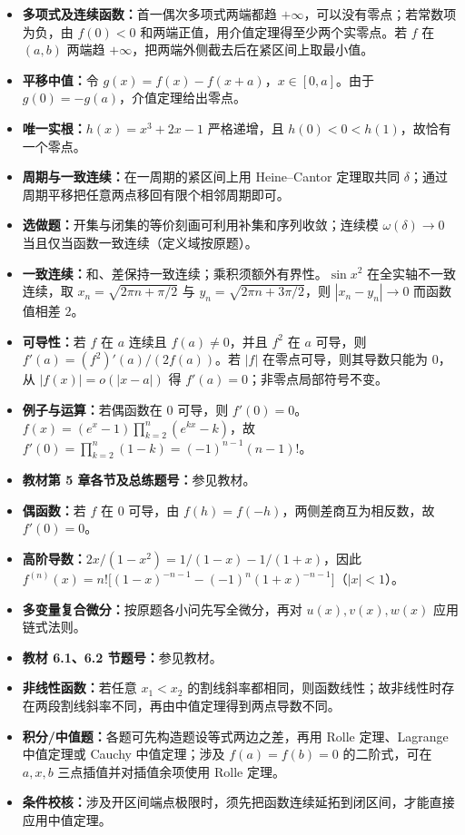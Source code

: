 \begin{itemize}
\item \textbf{多项式及连续函数：}首一偶次多项式两端都趋 $+\infty$，可以没有零点；若常数项为负，由 $f(0)<0$ 和两端正值，用介值定理得至少两个实零点。若 $f$ 在 $(a,b)$ 两端趋 $+\infty$，把两端外侧截去后在紧区间上取最小值。
\item \textbf{平移中值：}令 $g(x)=f(x)-f(x+a)$，$x\in[0,a]$。由于 $g(0)=-g(a)$，介值定理给出零点。
\item \textbf{唯一实根：}$h(x)=x^3+2x-1$ 严格递增，且 $h(0)<0<h(1)$，故恰有一个零点。
\item \textbf{周期与一致连续：}在一周期的紧区间上用 Heine--Cantor 定理取共同 $\delta$；通过周期平移把任意两点移回有限个相邻周期即可。
\item \textbf{选做题：}开集与闭集的等价刻画可利用补集和序列收敛；连续模 $\omega(\delta)\to0$ 当且仅当函数一致连续（定义域按原题）。
\end{itemize}

\begin{itemize}
\item \textbf{一致连续：}和、差保持一致连续；乘积须额外有界性。$\sin x^2$ 在全实轴不一致连续，取 $x_n=\sqrt{2\pi n+\pi/2}$ 与 $y_n=\sqrt{2\pi n+3\pi/2}$，则 $|x_n-y_n|\to0$ 而函数值相差 $2$。
\item \textbf{可导性：}若 $f$ 在 $a$ 连续且 $f(a)\ne0$，并且 $f^2$ 在 $a$ 可导，则 $f'(a)=(f^2)'(a)/(2f(a))$。若 $|f|$ 在零点可导，则其导数只能为 $0$，从 $|f(x)|=o(|x-a|)$ 得 $f'(a)=0$；非零点局部符号不变。
\item \textbf{例子与运算：}若偶函数在 $0$ 可导，则 $f'(0)=0$。$f(x)=(e^x-1)\prod_{k=2}^n(e^{kx}-k)$，故 $f'(0)=\prod_{k=2}^n(1-k)=(-1)^{n-1}(n-1)!$。
\end{itemize}

\begin{itemize}
\item \textbf{教材第 5 章各节及总练题号：}参见教材。
\item \textbf{偶函数：}若 $f$ 在 $0$ 可导，由 $f(h)=f(-h)$，两侧差商互为相反数，故 $f'(0)=0$。
\item \textbf{高阶导数：}$2x/(1-x^2)=1/(1-x)-1/(1+x)$，因此 $f^{(n)}(x)=n!\bigl[(1-x)^{-n-1}-(-1)^n(1+x)^{-n-1}\bigr]$（$|x|<1$）。
\item \textbf{多变量复合微分：}按原题各小问先写全微分，再对 $u(x),v(x),w(x)$ 应用链式法则。
\end{itemize}

\begin{itemize}
\item \textbf{教材 6.1、6.2 节题号：}参见教材。
\item \textbf{非线性函数：}若任意 $x_1<x_2$ 的割线斜率都相同，则函数线性；故非线性时存在两段割线斜率不同，再由中值定理得到两点导数不同。
\item \textbf{积分/中值题：}各题可先构造题设等式两边之差，再用 Rolle 定理、Lagrange 中值定理或 Cauchy 中值定理；涉及 $f(a)=f(b)=0$ 的二阶式，可在 $a,x,b$ 三点插值并对插值余项使用 Rolle 定理。
\item \textbf{条件校核：}涉及开区间端点极限时，须先把函数连续延拓到闭区间，才能直接应用中值定理。
\end{itemize}

